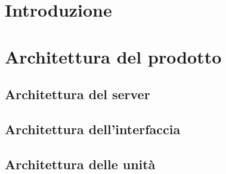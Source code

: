 \documentclass[]{article}
\begin{document}
	
	\newpage
	\tableofcontents
	\newpage
	\listoffigures
	\newpage

	\section{Introduzione}
	
	\newpage

	\section{Architettura del prodotto}
	
	\newpage

	\subsection{Architettura del server}
	
	\newpage

	\subsection{Architettura dell'interfaccia}
	
	\newpage

	\subsection{Architettura delle unità}
	
	\newpage
\end{document}
